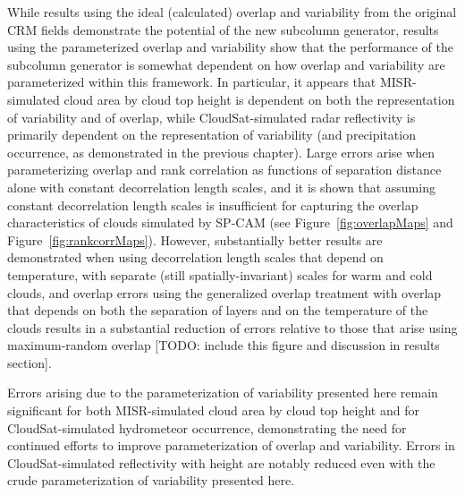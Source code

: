 While results using the ideal (calculated) overlap and variability from
the original CRM fields demonstrate the potential of the new subcolumn
generator, results using the parameterized overlap and variability show
that the performance of the subcolumn generator is somewhat dependent on
how overlap and variability are parameterized within this framework. In
particular, it appears that MISR-simulated cloud area by cloud top
height is dependent on both the representation of variability and of
overlap, while CloudSat-simulated radar reflectivity is primarily
dependent on the representation of variability (and precipitation
occurrence, as demonstrated in the previous chapter). Large errors arise
when parameterizing overlap and rank correlation as functions of
separation distance alone with constant decorrelation length scales, and
it is shown that assuming constant decorrelation length scales is
insufficient for capturing the overlap characteristics of clouds
simulated by SP-CAM (see Figure~\ref{fig:overlapMaps} and
Figure~\ref{fig:rankcorrMaps}). However, substantially better results
are demonstrated when using decorrelation length scales that depend on
temperature, with separate (still spatially-invariant) scales for warm
and cold clouds, and overlap errors using the generalized overlap
treatment with overlap that depends on both the separation of layers and
on the temperature of the clouds results in a substantial reduction of
errors relative to those that arise using maximum-random overlap
{[}TODO: include this figure and discussion in results section{]}.

Errors arising due to the parameterization of variability presented here
remain significant for both MISR-simulated cloud area by cloud top
height and for CloudSat-simulated hydrometeor occurrence, demonstrating
the need for continued efforts to improve parameterization of overlap
and variability. Errors in CloudSat-simulated reflectivity with height
are notably reduced even with the crude parameterization of variability
presented here.

